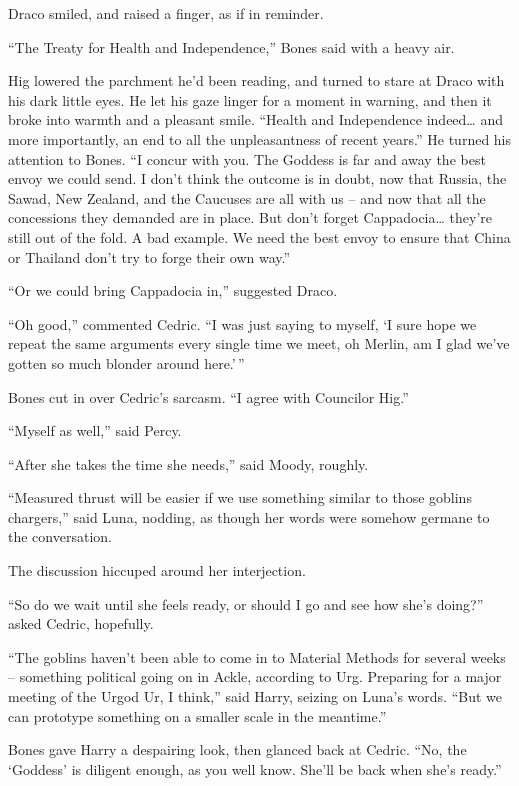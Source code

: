 Draco smiled, and raised a finger, as if in reminder.

``The Treaty for Health and Independence,'' Bones said with a heavy air.

Hig lowered the parchment he'd been reading, and turned to stare at
Draco with his dark little eyes. He let his gaze linger for a moment in
warning, and then it broke into warmth and a pleasant smile. ``Health
and Independence indeed\ldots{} and more importantly, an end to all the
unpleasantness of recent years.'' He turned his attention to Bones. ``I
concur with you. The Goddess is far and away the best envoy we could
send. I don't think the outcome is in doubt, now that Russia, the Sawad,
New Zealand, and the Caucuses are all with us -- and now that all the
concessions they demanded are in place. But don't forget
Cappadocia\ldots{} they're still out of the fold. A bad example. We need
the best envoy to ensure that China or Thailand don't try to forge their
own way.''

``Or we could bring Cappadocia in,'' suggested Draco.

``Oh good,'' commented Cedric. ``I was just saying to myself, `I sure
hope we repeat the same arguments every single time we meet, oh Merlin,
am I glad we've gotten so much blonder around here.'\,''

Bones cut in over Cedric's sarcasm. ``I agree with Councilor Hig.''

``Myself as well,'' said Percy.

``After she takes the time she needs,'' said Moody, roughly.

``Measured thrust will be easier if we use something similar to those
goblins chargers,'' said Luna, nodding, as though her words were somehow
germane to the conversation.

The discussion hiccuped around her interjection.

``So do we wait until she feels ready, or should I go and see how she's
doing?'' asked Cedric, hopefully.

``The goblins haven't been able to come in to Material Methods for
several weeks -- something political going on in Ackle, according to
Urg. Preparing for a major meeting of the Urgod Ur, I think,'' said
Harry, seizing on Luna's words. ``But we can prototype something on a
smaller scale in the meantime.''

Bones gave Harry a despairing look, then glanced back at Cedric. ``No,
the `Goddess' is diligent enough, as you well know. She'll be back when
she's ready.''

